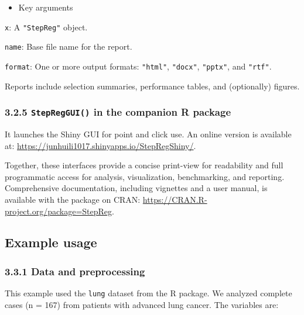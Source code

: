 \begin{itemize}
\tightlist
\item
  Key arguments
\end{itemize}

\texttt{x}: A \texttt{"StepReg"} object.

\texttt{name}: Base file name for the report.

\texttt{format}: One or more output formats: \texttt{"html"}, \texttt{"docx"}, \texttt{"pptx"}, and \texttt{"rtf"}.

Reports include selection summaries, performance tables, and (optionally) figures.

\subsubsection{\texorpdfstring{3.2.5 \texttt{StepRegGUI()} in the companion R package }{3.2.5 StepRegGUI() in the companion R package }}\label{stepreggui-in-the-companion-r-package}

It launches the Shiny GUI for point and click use. An online version is available at: \url{https://junhuili1017.shinyapps.io/StepRegShiny/}.

Together, these interfaces provide a concise print-view for readability and full programmatic access for analysis, visualization, benchmarking, and reporting. Comprehensive documentation, including vignettes and a user manual, is available with the package on CRAN: \url{https://CRAN.R-project.org/package=StepReg}.

\subsection{Example usage}\label{example-usage}

\subsubsection{3.3.1 Data and preprocessing}\label{data-and-preprocessing}

This example used the \texttt{lung} dataset from the  R package. We analyzed complete cases (n = 167) from patients with advanced lung cancer. The variables are:

